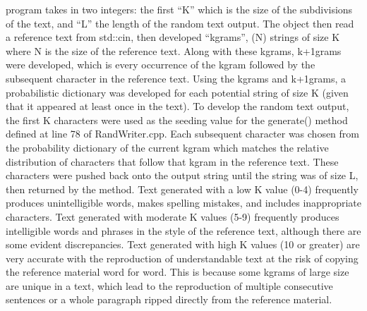 \documentclass[12pt]{article}
\begin{document}
\begin{minipage}{\dimexpr\textwidth-1cm}
 program takes in two integers: the first “K” which is the size of the subdivisions of the text, and “L” the length of the random text output. The object then read a reference text from std::cin, then developed “kgrams”, (N) strings of size K where N is the size of the reference text. Along with these kgrams, k+1grams were developed, which is every occurrence of the kgram followed by the subsequent character in the reference text. Using the kgrams and k+1grams, a probabilistic dictionary was developed for each potential string of size K (given that it appeared at least once in the text). To develop the random text output, the first K characters were used as the seeding value for the generate() method defined at line 78 of RandWriter.cpp. Each subsequent character was chosen from the probability dictionary of the current kgram which matches the relative distribution of characters that follow that kgram in the reference text. These characters were pushed back onto the output string until the string was of size L, then returned by the method. Text generated with a low K value (0-4) frequently produces unintelligible words, makes spelling mistakes, and includes inappropriate characters. Text generated with moderate K values (5-9) frequently produces intelligible words and phrases in the style of the reference text, although there are some evident discrepancies. Text generated with high K values (10 or greater) are very accurate with the reproduction of understandable text at the risk of copying the reference material word for word. This is because some kgrams of large size are unique in a text, which lead to the reproduction of multiple consecutive sentences or a whole paragraph ripped directly from the reference material.
\end{minipage}
\end{document}
